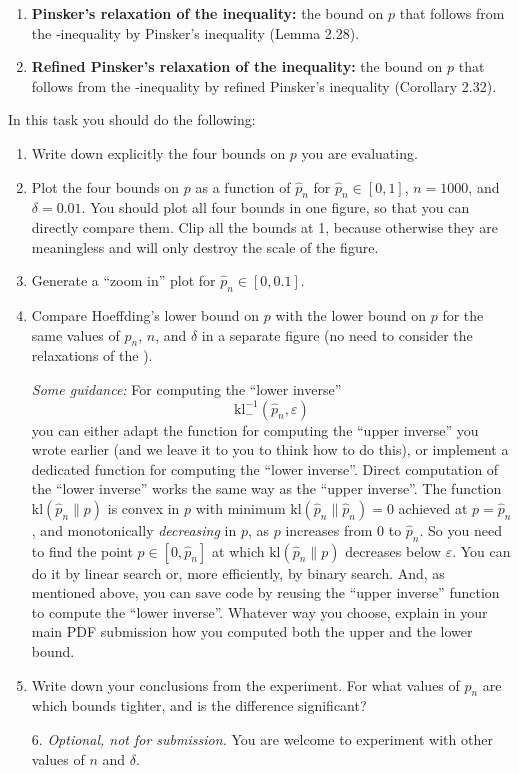 \documentclass[12pt]{article}
\newcommand{\kl}{\mathrm{kl}}
\begin{document}
\begin{enumerate}[label=\textbf{\Alph*.}]
\item \textbf{Pinsker’s relaxation of the \kl{} inequality:} the bound on $p$ that follows from the \kl{}‐inequality by Pinsker’s inequality (Lemma 2.28).

\item \textbf{Refined Pinsker’s relaxation of the \kl{} inequality:} the bound on $p$ that follows from the \kl{}‐inequality by refined Pinsker’s inequality (Corollary 2.32).

\end{enumerate}

\medskip
\noindent
In this task you should do the following:

\begin{enumerate}[label=\arabic*.]
\item Write down explicitly the four bounds on $p$ you are evaluating.
\item Plot the four bounds on $p$ as a function of $\hat p_n$ for $\hat p_n\in[0,1]$, $n=1000$, and $\delta=0.01$.  
  You should plot all four bounds in one figure, so that you can directly compare them.  
  Clip all the bounds at 1, because otherwise they are meaningless and will only destroy the scale of the figure.
\item Generate a “zoom in” plot for $\hat p_n\in[0,0.1]$.
\item Compare Hoeffding’s lower bound on $p$ with the \kl{} lower bound on $p$ for the same values of $\hat p_n$, $n$, and $\delta$ in a separate figure (no need to consider the relaxations of the \kl{}).

  \emph{Some guidance:} For computing the “lower inverse”
  \[
    \kl^{-1}_{-}(\hat p_n,\varepsilon)
  \]
  you can either adapt the function for computing the “upper inverse” you wrote earlier (and we leave it to you to think how to do this), or implement a dedicated function for computing the “lower inverse”.  Direct computation of the “lower inverse” works the same way as the “upper inverse”.  The function $\kl(\hat p_n\|p)$ is convex in $p$ with minimum $\kl(\hat p_n\|\hat p_n)=0$ achieved at $p=\hat p_n$, and monotonically \emph{decreasing} in $p$, as $p$ increases from 0 to $\hat p_n$.  So you need to find the point $p\in[0,\hat p_n]$ at which $\kl(\hat p_n\|p)$ decreases below $\varepsilon$.  You can do it by linear search or, more efficiently, by binary search.  And, as mentioned above, you can save code by reusing the “upper inverse” function to compute the “lower inverse”.  Whatever way you choose, explain in your main PDF submission how you computed both the upper and the lower bound.
\item Write down your conclusions from the experiment.  For what values of $\hat p_n$ are which bounds tighter, and is the difference significant?
\item[6.] \emph{Optional, not for submission.} You are welcome to experiment with other values of $n$ and $\delta$.
\end{enumerate}
\end{document}
